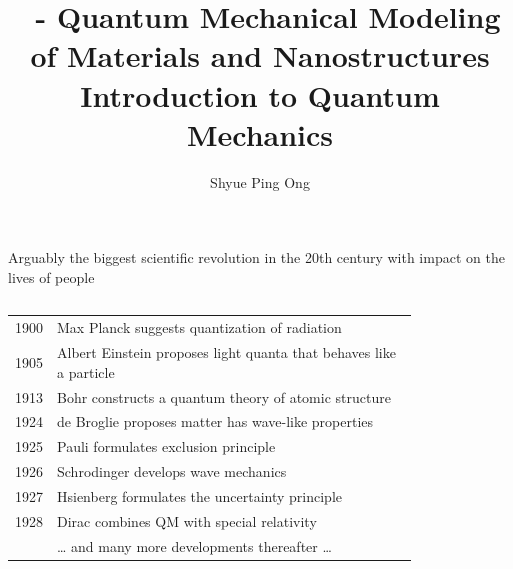 \documentclass[aspectratio=169]{beamer}
\title[\classname Introduction to Quantum Mechanics]{\classname~- Quantum Mechanical Modeling of Materials and Nanostructures\\Introduction to Quantum Mechanics}
\author{Shyue Ping Ong}
\institute[UCSD]{University of California, San Diego\\
\medskip
}
\date{\classyear} %
\begin{document}
    \begin{frame}
        \titlepage %
    \end{frame}


    \begin{frame}{Arguably the biggest scientific revolution in the 20th century with impact on the lives of people}
        \begin{columns}
            \begin{tabular}{cl}
                \small
                1900 & Max Planck suggests quantization of radiation                      \\
                1905 & Albert Einstein proposes light quanta that behaves like a particle \\
                1913 & Bohr constructs a quantum theory of atomic structure               \\
                1924 & de Broglie proposes matter has wave-like properties                \\
                1925 & Pauli formulates exclusion principle                               \\
                1926 & Schrodinger develops wave mechanics                                \\
                1927 & Hsienberg formulates the uncertainty principle                     \\
                1928 & Dirac combines QM with special relativity                          \\
                & … and many more developments thereafter …
            \end{tabular}
            \begin{figure}
                \centering

\end{figure}
\end{columns}
\end{frame}
\end{document}
